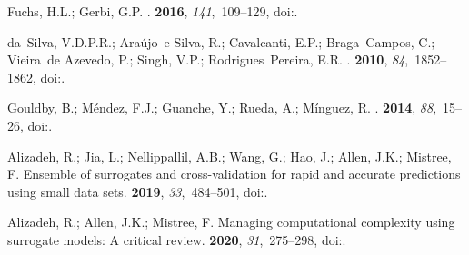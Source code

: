 \documentclass[energies,article,accept,moreauthors,pdftex]{Definitions/mdpi}
\begin{document}
\begin{thebibliography}{999}
Fuchs, H.L.; Gerbi, G.P.
.
 {\bf 2016}, {\em 141},~109--129, 
\newblock
  doi:{\href{https://doi.org/10.1016/j.pocean.2015.12.010}{}}.

da~Silva, V.D.P.R.; Ara{\'u}jo~e Silva, R.; Cavalcanti, E.P.; Braga~Campos, C.;
  Vieira~de Azevedo, P.; Singh, V.P.; Rodrigues~Pereira, E.R.
.
 {\bf 2010}, {\em 84},~1852--1862, 
\newblock
  doi:{\href{https://doi.org/10.1016/j.solener.2010.07.011}{}}.

Gouldby, B.; M{\'e}ndez, F.J.; Guanche, Y.; Rueda, A.; M{\'i}nguez, R.
.
 {\bf 2014}, {\em 88},~15--26, 
\newblock
  doi:{\href{https://doi.org/10.1016/j.coastaleng.2014.01.012}{}}.

Alizadeh, R.; Jia, L.; Nellippallil, A.B.; Wang, G.; Hao, J.; Allen, J.K.;
  Mistree, F.
\newblock Ensemble of surrogates and cross-validation for rapid and accurate
  predictions using small data sets.
 {\bf 2019}, {\em 33},~484–501, 
\newblock
  doi:{\href{https://doi.org/10.1017/S089006041900026X}{}}.

Alizadeh, R.; Allen, J.K.; Mistree, F.
\newblock Managing computational complexity using surrogate models: A critical
  review.
 {\bf 2020}, {\em 31},~275–298,  
\newblock
  doi:{\href{https://doi.org/10.1007/s00163-020-00336-7}{}}.


\end{thebibliography}
\end{document}
